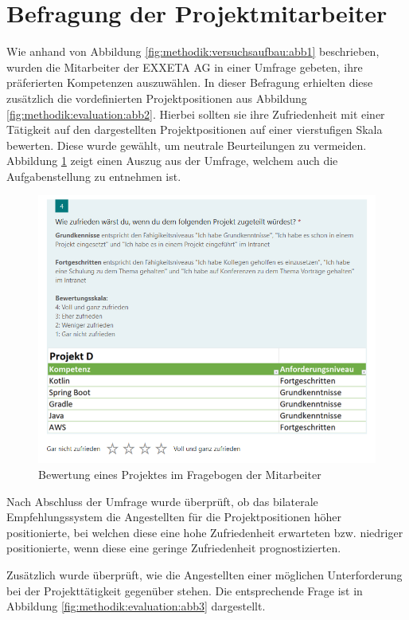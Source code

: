 \section{Befragung der Projektmitarbeiter}
\label{ch:methodik:evaluation:mitarbeiter}
Wie anhand von Abbildung \ref{fig:methodik:versuchsaufbau:abb1} beschrieben, wurden die Mitarbeiter der EXXETA AG in einer Umfrage gebeten, ihre präferierten Kompetenzen auszuwählen. In dieser Befragung erhielten diese zusätzlich die vordefinierten Projektpositionen aus Abbildung \ref{fig:methodik:evaluation:abb2}. Hierbei sollten sie ihre Zufriedenheit mit einer Tätigkeit auf den dargestellten Projektpositionen auf einer vierstufigen Skala bewerten. Diese wurde gewählt, um neutrale Beurteilungen zu vermeiden. Abbildung \ref{fig:methodik:evaluation:abb1} zeigt einen Auszug aus der Umfrage, welchem auch die Aufgabenstellung zu entnehmen ist.

\begin{figure}[h]
	\centering
	\includegraphics[width=1\textwidth]{gfx/projekt-umfrage.png}
	\caption{Bewertung eines Projektes im Fragebogen der Mitarbeiter}
	\label{fig:methodik:evaluation:abb1}
\end{figure}

Nach Abschluss der Umfrage wurde überprüft, ob das bilaterale Empfehlungssystem die Angestellten für die Projektpositionen höher positionierte, bei welchen diese eine hohe Zufriedenheit erwarteten bzw. niedriger positionierte, wenn diese eine geringe Zufriedenheit prognostizierten.

Zusätzlich wurde überprüft, wie die Angestellten einer möglichen Unterforderung bei der Projekttätigkeit gegenüber stehen. Die entsprechende Frage ist in Abbildung \ref{fig:methodik:evaluation:abb3} dargestellt.


